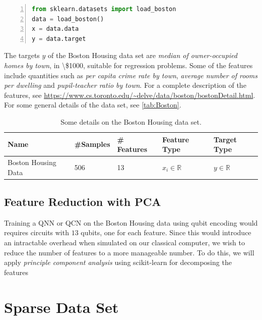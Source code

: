 \begin{lstlisting}[language=python, numbers=left]
from sklearn.datasets import load_boston
data = load_boston()
x = data.data
y = data.target
\end{lstlisting}

The targets $y$ of the Boston Housing data set are \emph{median of owner-occupied homes by town}, in \textbackslash \$1000, suitable for regression problems. Some of the features include quantities such as \emph{per capita crime rate by town}, \emph{average number of rooms per dwelling} and \emph{pupil-teacher ratio by town}. For a complete description of the features, see \url{https://www.cs.toronto.edu/~delve/data/boston/bostonDetail.html}. For some general details of the data set, see \autoref{tab:Boston}.

\begin{table}[H]
\begin{tabular}{|l|l|l|l|l|}
\hline
 Name& \#Samples&  \# Features& Feature Type& Target Type \\ \hline
 Boston Housing Data&  506&  13& $x_i \in \mathbb{R}$ & $y \in \mathbb{R}$  \\ 
 \hline
 
\end{tabular}
\caption{Some details on the Boston Housing data set.}
\label{tab:Boston}
\end{table}


\subsection{Feature Reduction with PCA}\label{sec:Feature Reduction wit PCA}
Training a QNN or QCN on the Boston Housing data using qubit encoding would requires circuits with $13$ qubits, one for each feature. Since this would introduce an intractable overhead when simulated on our classical computer, we wish to reduce the number of features to a more manageable number. To do this, we will apply \emph{principle component analysis} using scikit-learn for decomposing the features 


\section{Sparse Data Set}\label{sec:Spare Data Set}





